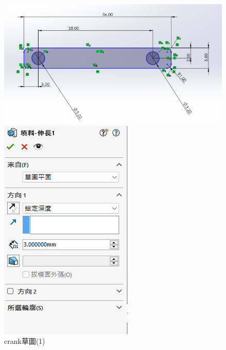 \begin{figure}[h!]
    \centering
    \begin{minipage}[b]{0.6\textwidth}
        \centering
        \includegraphics[width=\textwidth,height=0.30\textheight]{./../images/螢幕擷取畫面 2024-05-25 220448}
        \caption{crank草圖(1)}
        \label{fig:platform}
    \end{minipage}
    \hfill
    \begin{minipage}[b]{0.35\textwidth}
        \centering
        \includegraphics[width=\textwidth,height=0.35\textheight]{./../images/螢幕擷取畫面 2024-05-25 221952} 

\end{minipage}
\end{figure}
